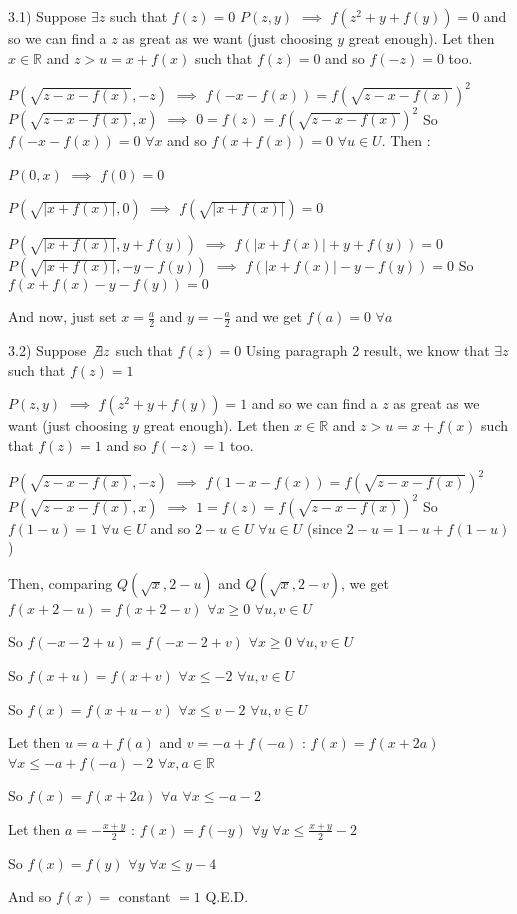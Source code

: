 \begin{solution}
3.1) Suppose $ \exists z$ such that $ f(z)=0$
$ P(z,y)$ $ \implies$ $ f(z^2+y+f(y))=0$ and so we can find a $ z$ as great as we want (just choosing $ y$ great enough).
Let then $ x\in \mathbb R$ and $ z>u=x+f(x)$ such that $ f(z)=0$ and so $ f(-z)=0$ too.

$ P(\sqrt{z-x-f(x)},-z)$ $ \implies$ $ f(-x-f(x))=f(\sqrt{z-x-f(x)})^2$
$ P(\sqrt{z-x-f(x)},x)$ $ \implies$ $ 0=f(z)=f(\sqrt{z-x-f(x)})^2$
So $ f(-x-f(x))=0$ $ \forall x$ and so $ f(x+f(x))=0$ $ \forall u\in U$. Then : 

$ P(0,x)$ $ \implies$ $ f(0)=0$

$ P(\sqrt{|x+f(x)|},0)$ $ \implies$ $ f(\sqrt{|x+f(x)|})=0$

$ P(\sqrt{|x+f(x)|},y+f(y))$ $ \implies$ $ f(|x+f(x)|+y+f(y))=0$
$ P(\sqrt{|x+f(x)|},-y-f(y))$ $ \implies$ $ f(|x+f(x)|-y-f(y))=0$
So $ f(x+f(x)-y-f(y))=0$

And now, just set $ x=\frac a2$ and $ y=-\frac a2$ and we get $ f(a)=0$ $ \forall a$

3.2) Suppose $ \not\exists z$ such that $ f(z)=0$
Using paragraph 2 result, we know that $ \exists z$ such that $ f(z)=1$

$ P(z,y)$ $ \implies$ $ f(z^2+y+f(y))=1$ and so we can find a $ z$ as great as we want (just choosing $ y$ great enough).
Let then $ x\in \mathbb R$ and $ z>u=x+f(x)$ such that $ f(z)=1$ and so $ f(-z)=1$ too.

$ P(\sqrt{z-x-f(x)},-z)$ $ \implies$ $ f(1-x-f(x))=f(\sqrt{z-x-f(x)})^2$
$ P(\sqrt{z-x-f(x)},x)$ $ \implies$ $ 1=f(z)=f(\sqrt{z-x-f(x)})^2$
So $ f(1-u)=1$ $ \forall u\in U$ and so $ 2-u\in U$ $ \forall u\in U$ (since $ 2-u=1-u+f(1-u)$)

Then, comparing $ Q(\sqrt x,2-u)$ and $ Q(\sqrt x, 2-v)$, we get $ f(x+2-u)=f(x+2-v)$ $ \forall x\geq 0$ $ \forall u,v\in U$

So $ f(-x-2+u)=f(-x-2+v)$ $ \forall x\geq 0$ $ \forall u,v\in U$

So $ f(x+u)=f(x+v)$ $ \forall x\leq -2$ $ \forall u,v\in U$

So $ f(x)=f(x+u-v)$ $ \forall x\leq v-2$ $ \forall u,v\in U$

Let then $ u=a+f(a)$ and $ v=-a+f(-a)$ : $ f(x)=f(x+2a)$ $ \forall x\leq -a+f(-a)-2$ $ \forall x, a\in \mathbb R$

So $ f(x)=f(x+2a)$ $ \forall a$ $ \forall x\leq -a-2$ 

Let then $ a=-\frac{x+y}2$ : $ f(x)=f(-y)$ $ \forall y$ $ \forall x\leq \frac{x+y}2-2$ 

So $ f(x)=f(y)$ $ \forall y$ $ \forall x\leq y-4$

And so $ f(x)=$ constant $ =1$
Q.E.D.
\end{solution}



